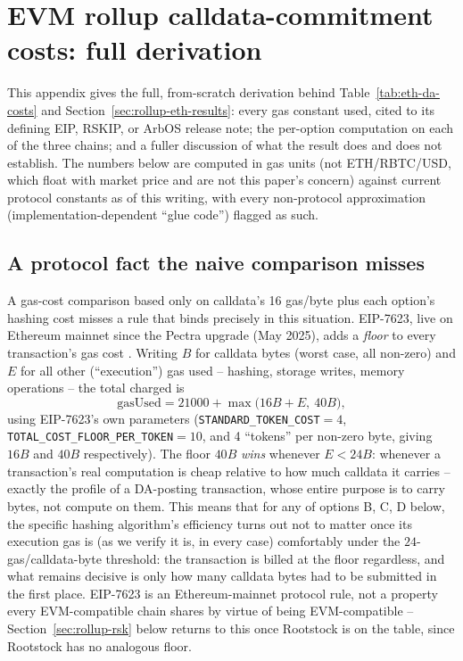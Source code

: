 \section{EVM rollup calldata-commitment costs: full derivation}
\label{app:eth-da}

This appendix gives the full, from-scratch derivation behind
Table~\ref{tab:eth-da-costs} and Section~\ref{sec:rollup-eth-results}:
every gas constant used, cited to its defining EIP, RSKIP, or ArbOS
release note; the per-option computation on each of the three chains;
and a fuller discussion of what the result does and does not establish.
The numbers below are computed in gas units (not ETH/RBTC/USD, which
float with market price and are not this paper's concern) against
current protocol constants as of this writing, with every non-protocol
approximation (implementation-dependent ``glue code'') flagged as such.

\subsection{A protocol fact the naive comparison misses}
\label{sec:rollup-eth-7623}

A gas-cost comparison based only on calldata's 16 gas/byte plus each
option's hashing cost misses a rule that binds precisely in this situation.
EIP-7623, live on Ethereum mainnet since the Pectra upgrade (May 2025), adds
a \emph{floor} to every transaction's gas cost \citep{eip7623}. Writing
$B$ for calldata bytes (worst case, all non-zero) and $E$ for all other
(``execution'') gas used -- hashing, storage writes, memory operations --
the total charged is
\begin{equation}
\mathrm{gasUsed} = 21000 + \max\big(16B + E,\ 40B\big),
\end{equation}
using EIP-7623's own parameters (\texttt{STANDARD\_TOKEN\_COST}$=4$,
\texttt{TOTAL\_COST\_FLOOR\_PER\_TOKEN}$=10$, and 4 ``tokens'' per non-zero
byte, giving $16B$ and $40B$ respectively). The floor $40B$ \emph{wins}
whenever $E < 24B$: whenever a transaction's real computation is cheap
relative to how much calldata it carries -- exactly the profile of a
DA-posting transaction, whose entire purpose is to carry bytes, not compute
on them. This means that for any of options B, C, D below, the specific
hashing algorithm's efficiency turns out not to matter once its execution
gas is (as we verify it is, in every case) comfortably under the
$24$-gas/calldata-byte threshold: the transaction is billed at the floor
regardless, and what remains decisive is only how many calldata bytes had
to be submitted in the first place. EIP-7623 is an Ethereum-mainnet
protocol rule, not a property every EVM-compatible chain shares by virtue
of being EVM-compatible -- Section~\ref{sec:rollup-rsk} below returns to
this once Rootstock is on the table, since Rootstock has no analogous
floor.

